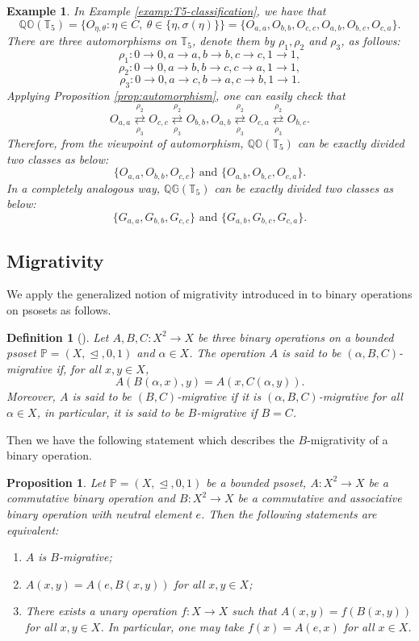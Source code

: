 \documentclass[preprint,12pt]{elsarticle}
\newtheorem{proposition}[theorem]{Proposition}
\newtheorem{definition}[theorem]{Definition}
\newtheorem{example}[theorem]{Example}
\begin{document}
\begin{example}\label{prop:T5-orbits}
\emph{In Example \ref{examp:T5-classification}, we have that $$\mathbb{QO}(\mathbb{T}_5)=\{O_{\eta,\theta}:\eta\in C,\ \theta\in\{\eta,\sigma(\eta)\}\}=\{O_{a,a},O_{b,b},O_{c,c},O_{a,b},O_{b,c},O_{c,a}\}.$$
There are three automorphisms on $\mathbb{T}_5$, denote them by $\rho_1, \rho_2$ and $\rho_3$, as follows:
$$\rho_1: 0\rightarrow 0, a\rightarrow a, b\rightarrow b, c\rightarrow c, 1\rightarrow 1,$$
  $$\rho_2: 0\rightarrow 0, a\rightarrow b, b\rightarrow c, c\rightarrow a, 1\rightarrow 1,$$
 $$\rho_3: 0\rightarrow 0, a\rightarrow c, b\rightarrow a, c\rightarrow b, 1\rightarrow 1.$$
Applying Proposition \ref{prop:automorphism}, one can easily check that $$O_{a,a}{\underset{\rho_3}{\overset{\rho_2}{\rightleftarrows}}} O_{c,c}{\underset{\rho_3}{\overset{\rho_2}{\rightleftarrows}}} O_{b,b}, O_{a,b}{\underset{\rho_3}{\overset{\rho_2}{\rightleftarrows}}} O_{c,a}{\underset{\rho_3}{\overset{\rho_2}{\rightleftarrows}}} O_{b,c}.$$
Therefore, from the viewpoint of automorphism, $\mathbb{QO}(\mathbb{T}_5)$ can be exactly divided two classes as below:
 $$\{O_{a,a},O_{b,b},O_{c,c}\} \mbox{ and }
 \{O_{a,b},O_{b,c},O_{c,a}\}.
$$
In a completely analogous way, $\mathbb{QG}(\mathbb{T}_5)$ can be exactly divided two classes as below:
 $$\{G_{a,a},G_{b,b},G_{c,c}\} \mbox{ and }
 \{G_{a,b},G_{b,c},G_{c,a}\}.
$$}
\end{example}
\subsection{Migrativity}
We apply the generalized notion of migrativity introduced in \cite{Qiao2021} to binary operations on psosets as follows.
\begin{definition}[\cite{Qiao2021}]
\emph{Let $A,B,C:X^2\to X$ be three binary operations on a bounded psoset $\mathbb{P}=(X,\trianglelefteq,0,1)$ and $\alpha\in X$. The operation $A$ is said to be $(\alpha,B,C)$-\emph{migrative} if, for all $x,y\in X$,
$$
 A(B(\alpha,x),y)=A(x,C(\alpha,y)).
$$
Moreover, $A$ is said to be $(B,C)$-migrative if it is $(\alpha,B,C)$-\emph{migrative} for all $\alpha\in X$, in particular, it is said to be $B$-migrative if $B=C$.}
\end{definition}

Then we have the following statement which describes the $B$-migrativity of a binary operation.
\begin{proposition}\label{prop:migrative-factorization}
Let $\mathbb{P}=(X,\trianglelefteq,0,1)$ be a bounded psoset, $A:X^2\to X$ be a commutative binary operation and $B:X^2\to X$ be a commutative and associative binary operation with neutral element $e$. Then the following statements are equivalent:
\begin{enumerate}[label=(\roman*)]
\item $A$ is $B$-migrative;
\item $A(x,y)=A(e,B(x,y))$ for all $x,y\in X$;
\item There exists a unary operation $f:X\to X$ such that $A(x,y)=f(B(x,y))$ for all $x,y\in X$. In particular, one may take $f(x)=A(e,x)$ for all $x\in X$.
\end{enumerate}
\end{proposition}
\end{document}
